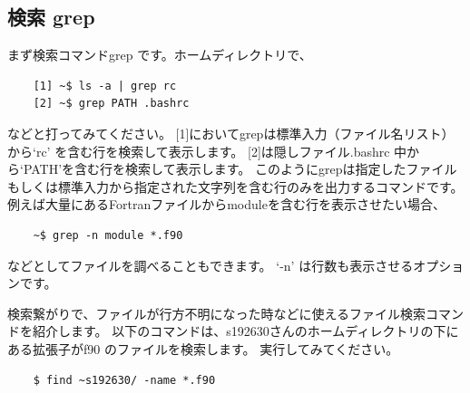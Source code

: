 \documentclass[a4j]{ltjreport}
\begin{document}
    \subsection{検索 grep} 
    まず検索コマンドgrep です。ホームディレクトリで、
    \begin{verbatim}
    [1] ~$ ls -a | grep rc
    [2] ~$ grep PATH .bashrc
    \end{verbatim}
    などと打ってみてください。
    [1]においてgrepは標準入力（ファイル名リスト）から`rc' を含む行を検索して表示します。
    [2]は隠しファイル.bashrc 中から`PATH'を含む行を検索して表示します。
    このようにgrepは指定したファイルもしくは標準入力から指定された文字列を含む行のみを出力するコマンドです。
    例えば大量にあるFortranファイルからmoduleを含む行を表示させたい場合、
    \begin{verbatim}
    ~$ grep -n module *.f90
    \end{verbatim}
    などとしてファイルを調べることもできます。
    `-n' は行数も表示させるオプションです。

    検索繋がりで、ファイルが行方不明になった時などに使えるファイル検索コマンドを紹介します。
    以下のコマンドは、s192630さんのホームディレクトリの下にある拡張子がf90 のファイルを検索します。
    実行してみてください。
    \begin{verbatim}
    $ find ~s192630/ -name *.f90
    \end{verbatim}
\end{document}
